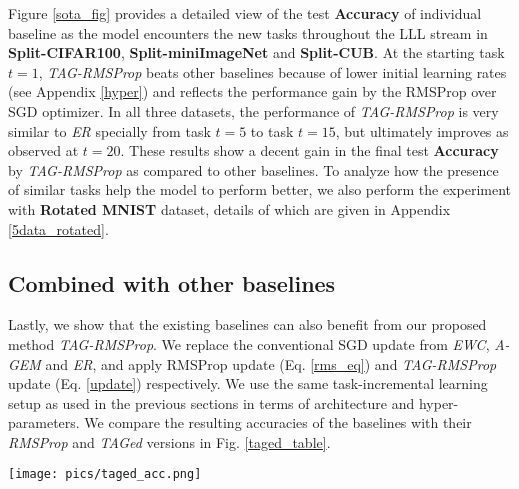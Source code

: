 \documentclass{article} \usepackage{collas2022_conference,times}
\begin{document}
    Figure \ref{sota_fig} provides a detailed view of the test \textbf{Accuracy} of individual baseline as the model encounters the new tasks throughout the LLL stream in \textbf{Split-CIFAR100}, \textbf{Split-miniImageNet} and \textbf{Split-CUB}. At the starting task $t=1$, \textit{TAG-RMSProp} beats other baselines because of lower initial learning rates (see Appendix \ref{hyper}) and reflects the performance gain by the RMSProp over SGD optimizer. In all three datasets, the performance of \textit{TAG-RMSProp} is very similar to \textit{ER} specially from task $t=5$ to task $t=15$, but ultimately improves as observed at $t=20$. These results show a decent gain in the final test \textbf{Accuracy} by \textit{TAG-RMSProp} as compared to other baselines. To analyze how the presence of similar tasks help the model to perform better, we also perform the experiment with \textbf{Rotated MNIST} \citep{lopez2017gradient} dataset, details of which are given in Appendix \ref{5data_rotated}.




\subsection{Combined with other baselines}\label{tag_base_opt}


    Lastly, we show that the existing baselines can also benefit from our proposed method \textit{TAG-RMSProp}. We replace the conventional SGD update from \textit{EWC}, \textit{A-GEM} and \textit{ER}, and apply RMSProp update (Eq. \ref{rms_eq}) and \textit{TAG-RMSProp} update (Eq. \ref{update}) respectively. We use the same task-incremental learning setup as used in the previous sections in terms of architecture and hyper-parameters. We compare the resulting accuracies of the baselines with their \textit{RMSProp} and \textit{TAGed} versions in Fig. \ref{taged_table}. 
    
    \begin{figure*}[h!]
        \centering
        \texttt{[image: pics/taged\_acc.png]}
        \caption{Comparing performance for different existing methods with their \textit{RMSProp} and \textit{TAGed} versions on all four datasets in terms of final average test \textbf{Accuracy (\%)} along with \textit{A-GEM} and \textit{ER} for different samples per class ($\mathbb{M}$) in the episodic memory. The vertical bars with hatches are the performance by \textit{TAGed} versions of the baselines. All results are averaged across 5 runs. All \textit{TAGed} versions results in a similar gain in the accuracy over baselines with both SGD and RMSProp update.}
        \label{taged_table}
    \end{figure*}
\end{document}
